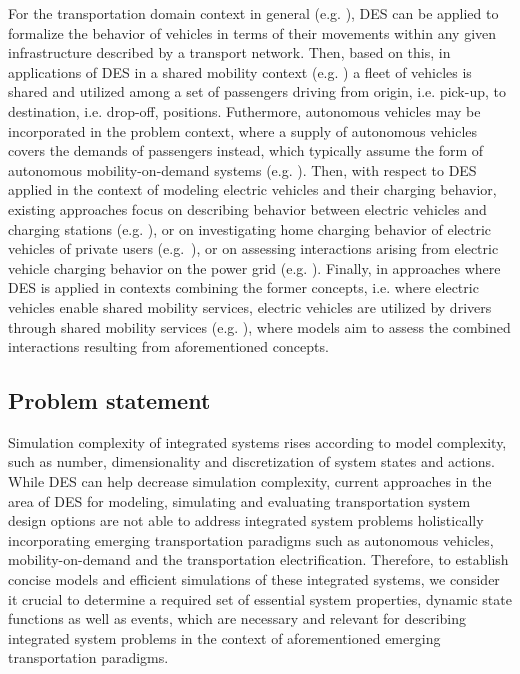 \documentclass[graybox]{svmult}
\begin{document}
For the transportation domain context in general (e.g. \cite{burghout2006discrete}), DES can be applied to formalize the behavior of vehicles in terms of their movements within any given infrastructure described by a transport network. Then, based on this, in applications of DES in a shared mobility context (e.g. \cite{clemente2013discrete}) a fleet of vehicles is shared and utilized among a set of passengers driving from origin, i.e. pick-up, to destination, i.e. drop-off, positions. Futhermore, autonomous vehicles may be incorporated in the problem context, where a supply of autonomous vehicles covers the demands of passengers instead, which typically assume the form of autonomous mobility-on-demand systems (e.g. \cite{jager2018multi, gurumurthy2021system}).
Then, with respect to DES applied in the context of modeling electric vehicles and their charging behavior, existing approaches focus on describing behavior between electric vehicles and charging stations (e.g. \cite{lebeau2013implementing}), or on investigating home charging behavior of electric vehicles of private users (e.g.~\cite{lopez2021modeling}), or on assessing interactions arising from electric vehicle charging behavior on the power grid (e.g.  \cite{darabi2013event, ferro2019predictive}).
Finally, in approaches where DES is applied in contexts combining the former concepts, i.e. where electric vehicles enable shared mobility services, electric vehicles are utilized by drivers through shared mobility services (e.g. \cite{fanti2017fleet, hamroun2020modelling, li2021simulation}), where models aim to assess the combined interactions resulting from aforementioned concepts.

\subsection{Problem statement}

Simulation complexity of integrated systems rises according to model complexity, such as number, dimensionality and discretization of system states and actions. While DES can help decrease simulation complexity, current approaches in the area of DES for modeling, simulating and evaluating transportation system design options are not able to address integrated system problems holistically incorporating emerging transportation paradigms such as autonomous vehicles, mobility-on-demand and the transportation electrification.
Therefore, to establish concise models and efficient simulations of these integrated systems, we consider it crucial to determine a required set of essential system properties, dynamic state functions as well as events, which are necessary and relevant for describing integrated system problems in the context of aforementioned emerging transportation paradigms.
\end{document}
